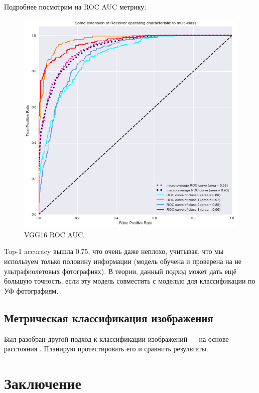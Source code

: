 \documentclass[14pt]{matmex-diploma}
\begin{document}
        Подробнее посмотрим на ROC AUC метрику:
    
        \begin{figure}[h!]
            \centering
            \includegraphics[scale=0.6]{images/auc.png}
            \caption{VGG16 ROC AUC.}
            \label{auc}
        \end{figure}    
        
        Top-1 accuracy вышла 0.75, что очень даже неплохо, учитывая, что мы используем только половину информации (модель обучена и проверена на не ультрафиолетовых фотографиях). В теории, данный подход может дать ещё большую точность, если эту модель совместить с моделью для классификации по УФ фотографиям.


    \subsection{Метрическая классификация изображения}
        
        Был разобран другой подход к классификации изображений — на основе расстояния \cite{paper:oneshot}. Планирую протестировать его и сравнить результаты.
        
    

\section*{Заключение}
\end{document}
